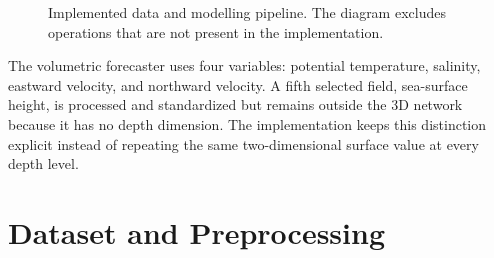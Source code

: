 \begin{figure}[htbp]
\centering
{}
\caption{Implemented data and modelling pipeline. The diagram excludes operations that are not present in the implementation.}
\label{fig:implemented-pipeline}
\end{figure}

The volumetric forecaster uses four variables: potential temperature, salinity, eastward velocity, and northward velocity. A fifth selected field, sea-surface height, is processed and standardized but remains outside the 3D network because it has no depth dimension. The implementation keeps this distinction explicit instead of repeating the same two-dimensional surface value at every depth level.

\section{Dataset and Preprocessing}

